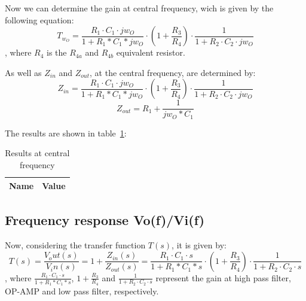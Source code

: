 Now we can determine the gain at central frequency, wich is given by the following equation:
\begin{equation}
	T_{w_O}=\frac{R_1\cdot C_1 \cdot jw_O}{1+R_1*C_1*jw_O}\cdot(1+ \frac{R_3}{R_4}) \cdot \frac{1}{1+R_2 \cdot C_2\cdot jw_O}
\end{equation}
, where $R_4$ is the $R_{4a}$ and $R_{4b}$ equivalent resistor.

As well as $Z_{in}$ and $Z_{out}$, at the central frequency, are determined by:
\begin{equation}
	Z_{in}=\frac{R_1\cdot C_1 \cdot jw_O}{1+R_1*C_1*jw_O}\cdot(1+ \frac{R_3}{R_4}) \cdot \frac{1}{1+R_2 \cdot C_2\cdot jw_O}
\end{equation}
\begin{equation}
	Z_{out}=R_1+\frac{1}{jw_O*C_1}
\end{equation}

The results are shown in table~\ref{tab:results1}:
\begin{table}[H]
  \centering
  \begin{tabular}{|l|r|}
     \hline    
    {\bf Name} & {\bf Value} \\ \hline   
    
  \end{tabular}
  \caption{Results at central frequency}
  \label{tab:results1}
\end{table}

\subsection{Frequency response Vo(f)/Vi(f)}
Now, considering the transfer function $T(s)$, it is given by:
\begin{equation}
	T(s)=\frac{V_out(s)}{V_in(s)}=1+\frac{Z_{in}(s)}{Z_{out}(s)}=\frac{R_1\cdot C_1 \cdot s}{1+R_1*C_1*s}\cdot(1+ \frac{R_3}{R_4}) \cdot \frac{1}{1+R_2 \cdot C_2\cdot s}
\end{equation}
, where $\frac{R_1\cdot C_1 \cdot s}{1+R_1*C_1*s}$, $1+\frac{R_3}{R_4}$ and $\frac{1}{1+R_2\cdot C_2\cdot s}$ represent
the gain at high pass filter, OP-AMP and low pass filter, respectively.

